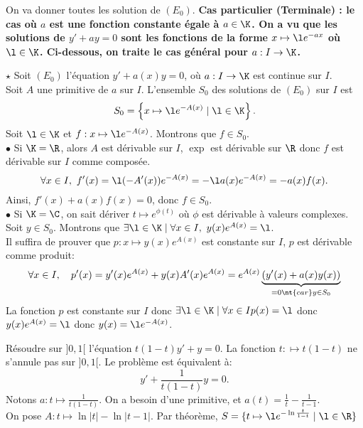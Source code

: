 \documentclass[11pt]{article}
\begin{document}
On va donner toutes les solution de $(E_0)$.\n
\bf{Cas particulier} (Terminale) : le cas où $a$ est une fonction constante égale à $a\in\K$. On a vu que les solutions de $y'+ay=0$ sont les fonctions de la forme $x\mapsto \l e^{-ax}$ où $\l\in\K$.\n
Ci-dessous, on traite le cas général pour $a:I\to\K$.

\begin{thm}{$\star$}{}
    Soit $(E_0)$ l'équation $y'+a(x)y=0$, où $a:I\to\K$ est continue sur $I$.\\
    Soit $A$ une primitive de $a$ sur $I$. L'ensemble $S_0$ des solutions de $(E_0)$ sur $I$ est
    \begin{equation*}
        S_0=\left\{ x\mapsto \l e^{-A(x)} \mid \l\in\K \right\}.
    \end{equation*}
    \tcblower
    \boxed{\supset} Soit $\l\in\K$ et $f:x\mapsto \l e^{-A(x)}$. Montrons que $f\in S_0$.\\
    $\bullet$ Si $\K=\R$, alors $A$ est dérivable sur $I$, $\exp$ est dérivable sur $\R$ donc $f$ est dérivable sur $I$ comme composée.
    \begin{equation*}
        \forall x \in I, ~ f'(x) = \l(-A'(x))e^{-A(x)} = -\l a(x)e^{-A(x)}=-a(x)f(x).
    \end{equation*}
    Ainsi, $f'(x)+a(x)f(x)=0$, donc $f\in S_0$.\\
    $\bullet$ Si $\K=\C$, on sait dériver $t\mapsto e^{\phi(t)}$ où $\phi$ est dérivable à valeurs complexes.\n
    \boxed{\subset} Soit $y\in S_0$. Montrons que $\exists \l \in \K \mid \forall x \in I, ~ y(x)e^{A(x)}=\l$.\\
    Il suffira de prouver que $p:x\mapsto y(x)e^{A(x)}$ est constante sur $I$, $p$ est dérivable comme produit:
    \begin{equation*}
        \forall x \in I, \quad p'(x)=y'(x)e^{A(x)}+y(x)A'(x)e^{A(x)}=e^{A(x)}\underbrace{\left(y'(x) + a(x)y(x)\right)}_{=0 \nt{ car } y\in S_0} 
    \end{equation*}
    La fonction $p$ est constante sur $I$ donc $\exists \l \in \K \mid \forall x \in I p(x)=\l$ donc $y(x)e^{A(x)}=\l$ donc $y(x)=\l e^{-A(x)}$.
\end{thm}


\begin{ex}{}{}
    Résoudre sur $]0,1[$ l'équation $t(1-t)y'+y=0$.
    \tcblower
    La fonction $t:\mapsto t(1-t)$ ne s'annule pas sur $]0,1[$. Le problème est équivalent à:
    \begin{equation*}
        y'+\frac{1}{t(1-t)}y=0.
    \end{equation*}
    Notons $a:t\mapsto\frac{1}{t(1-t)}$. On a besoin d'une primitive, et $a(t)=\frac{1}{t}-\frac{1}{t-1}$.\\
    On pose $A:t\mapsto \ln|t|-\ln|t-1|$. Par théorème, $S=\{t\mapsto \l e^{-\ln\frac{t}{1-t}} \mid \l \in \R\}$
\end{ex}
\end{document}
